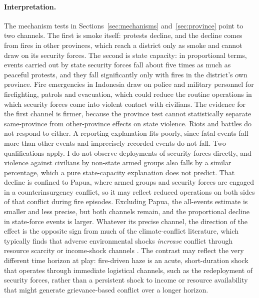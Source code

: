 \documentclass[12pt]{article}
\begin{document}
\paragraph{Interpretation.} The mechanism tests in Sections~\ref{sec:mechanisms} and~\ref{sec:province} point to two channels. The first is smoke itself: protests decline, and the decline comes from fires in other provinces, which reach a district only as smoke and cannot draw on its security forces. The second is state capacity: in proportional terms, events carried out by state security forces fall about five times as much as peaceful protests, and they fall significantly only with fires in the district's own province. Fire emergencies in Indonesia draw on police and military personnel for firefighting, patrols and evacuation, which could reduce the routine operations in which security forces come into violent contact with civilians. The evidence for the first channel is firmer, because the province test cannot statistically separate same-province from other-province effects on state violence. Riots and battles do not respond to either. A reporting explanation fits poorly, since fatal events fall more than other events and imprecisely recorded events do not fall. Two qualifications apply. I do not observe deployments of security forces directly, and violence against civilians by non-state armed groups also falls by a similar percentage, which a pure state-capacity explanation does not predict. That decline is confined to Papua, where armed groups and security forces are engaged in a counterinsurgency conflict, so it may reflect reduced operations on both sides of that conflict during fire episodes. Excluding Papua, the all-events estimate is smaller and less precise, but both channels remain, and the proportional decline in state-force events is larger. Whatever its precise channel, the direction of the effect is the opposite sign from much of the climate-conflict literature, which typically finds that adverse environmental shocks \emph{increase} conflict through resource scarcity or income-shock channels \citep{hsiang2013quantifying,burkehsiangmiguel2015,miguelsatyanathsergenti2004}. The contrast may reflect the very different time horizon at play: fire-driven haze is an acute, short-duration shock that operates through immediate logistical channels, such as the redeployment of security forces, rather than a persistent shock to income or resource availability that might generate grievance-based conflict over a longer horizon.
\end{document}
